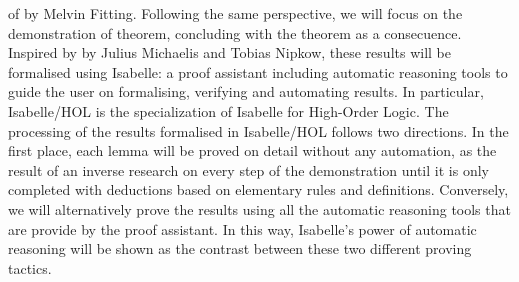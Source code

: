 \begin{isabellebody}
\begin{isamarkuptext}
of   by Melvin Fitting. 
Following the same perspective, we will focus on the demonstration of 
 theorem, concluding with the  theorem as a consecuence. Inspired by   by 
Julius Michaelis and Tobias Nipkow, these results will be formalised using 
Isabelle: a proof assistant including automatic reasoning tools to guide the 
user on formalising, verifying and automating results. In particular, 
Isabelle/HOL is the specialization of Isabelle for High-Order Logic. The 
processing of the results formalised in Isabelle/HOL follows two directions. 
In the first place, each lemma will be proved on detail without any automation, 
as the result of an inverse research on every step of the demonstration until 
it is only completed with deductions based on elementary rules and definitions. 
Conversely, we will alternatively prove the results using all the 
automatic reasoning tools that are provide by the proof assistant. In 
this way, Isabelle’s power of automatic reasoning will be shown as the 
contrast between these two different proving tactics.%
\end{isamarkuptext}\isamarkuptrue%
%
\isadelimtheory
%
\endisadelimtheory
%
\isatagtheory
%
\endisatagtheory
{\isafoldtheory}%
%
\isadelimtheory
%
\endisadelimtheory
%
\end{isabellebody}%
\endinput
